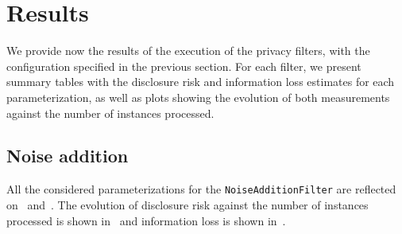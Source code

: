 \section{Results}
\label{Benchmarking:Results}

We provide now the results of the execution of the privacy filters, with the configuration specified in the previous section. For each filter, we present summary tables with the disclosure risk and information loss estimates for each parameterization, as well as plots showing the evolution of both measurements against the number of instances processed.

\subsection{Noise addition}
\label{Benchmarking:Results:Noise}

All the considered parameterizations for the \texttt{NoiseAdditionFilter} are reflected on~ and~. The evolution of disclosure risk against the number of instances processed is shown in~ and information loss is shown in~.


